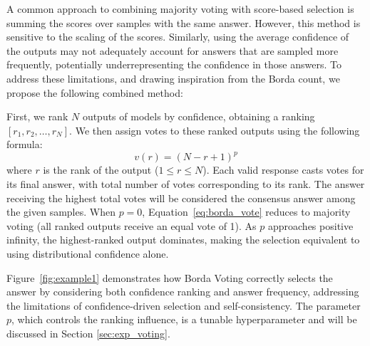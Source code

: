A common approach to combining majority voting with score-based selection is summing the scores over samples with the same answer. However, this method is sensitive to the scaling of the scores. Similarly, using the average confidence of the outputs may not adequately account for answers that are sampled more frequently, potentially underrepresenting the confidence in those answers. To address these limitations, and drawing inspiration from the Borda count, we propose the following combined method: 

First, we rank \(N\) outputs of models by confidence, obtaining a ranking \([r_1, r_2, \dots, r_N]\). We then assign votes to these ranked outputs using the following formula:
\begin{equation} \label{eq:borda_vote}
    v(r) = (N - r + 1)^p
\end{equation}
where \(r\) is the rank of the output (\(1 \le r \le N\)). Each valid response casts votes for its final answer, with total number of votes corresponding to its rank. The answer receiving the highest total votes will be considered the consensus answer among the given samples. When \(p = 0\), Equation~\eqref{eq:borda_vote} reduces to majority voting (all ranked outputs receive an equal vote of 1). As \(p\) approaches positive infinity, the highest-ranked output dominates, making the selection equivalent to using distributional confidence alone.

Figure~\ref{fig:example1} demonstrates how Borda Voting correctly selects the answer by considering both confidence ranking and answer frequency, addressing the limitations of confidence-driven selection and self-consistency. The parameter \(p\), which controls the ranking influence,  is a tunable hyperparameter and will be discussed in Section \ref{sec:exp_voting}.